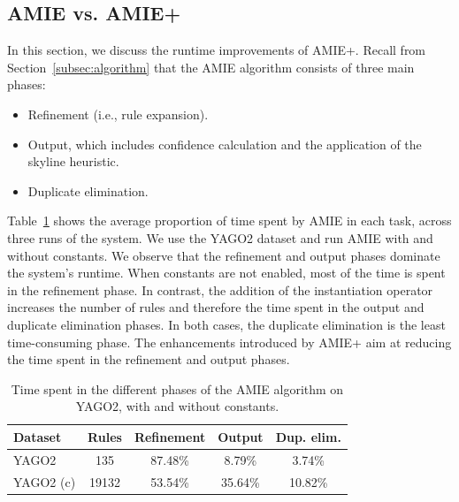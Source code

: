 \subsection{AMIE vs. AMIE+}\label{amiepm}

In this section, we discuss the runtime improvements of AMIE+.
Recall from Section~\ref{subsec:algorithm} that the AMIE algorithm consists of three main phases:
\begin{itemize}
 \item Refinement (i.e., rule expansion). 
 \item Output, which includes confidence calculation and the application of the skyline heuristic.
 \item Duplicate elimination.
\end{itemize}

Table~\ref{timeProportion} shows the average proportion of time spent by AMIE in each task, across 
three runs of the system. 
We use the YAGO2 dataset and run AMIE with and without constants. 
We observe that the refinement and output phases dominate the system's runtime. 
When constants are not enabled, most of the time is spent in the refinement phase. In contrast, 
the addition of the instantiation operator increases the number of rules and therefore the time
spent in the output and duplicate elimination phases. In both cases, 
the duplicate elimination is the least time-consuming phase. 
The enhancements introduced by AMIE+ aim at reducing the time spent in the 
refinement and output phases.
\begin{center}
\begin{table}
\footnotesize
\begin{tabular}{|l|c|c|c|c|}
\hline
Dataset		& Rules	&  Refinement	& Output 	& Dup. elim.  \\ \hline
YAGO2  		& 135	&  87.48\% 	& 8.79\% 	& 3.74\% \\
YAGO2 (c)  	& 19132	&  53.54\%	& 35.64\% 	& 10.82\% \\ \hline
\end{tabular}
\caption{Time spent in the different phases of the AMIE algorithm on YAGO2, with and without constants.}
\label{timeProportion}
\end{table}
\end{center}






